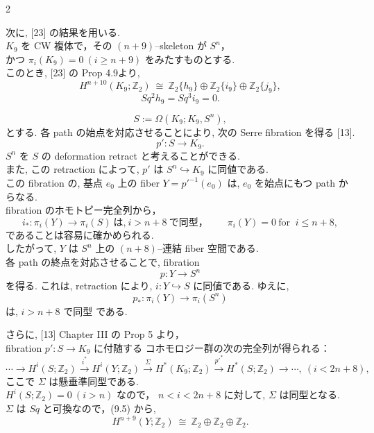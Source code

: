 \documentclass[10pt, leqno]{ltjsarticle}
\newcommand{\gen}[1]{\{#1\}}       %
\newcommand{\z}{\mathbb{Z}}
\numberwithin{equation}{section}
\theoremstyle{plain}
\theoremstyle{definition}
\theoremstyle{remark}
\begin{document}
\begin{paracol}{2}

次に, [23] の結果を用いる. \\
$K_9$ を CW 複体で，その $(n+9)$–skeleton が $S^n$，\\
かつ $\pi_i(K_9)=0\ (i\ge n+9)$ をみたすものとする. \\
このとき, [23] の Prop 4.9より, 
\begin{equation}\label{eq:K9coh}
H^{n+10}(K_9;\mathbb Z_2)\ \cong\ 
\z_2\gen{h_9}\oplus\z_2\gen{i_9}\oplus\z_2\gen{j_9},
\end{equation}
\[
Sq^2 h_9 = Sq^3 i_9 = 0.
\]

\[
S := \Omega(K_9; K_9, S^n),
\]
とする.
各 path の始点を対応させることにより, 
次の Serre fibration を得る [13].
\[
p':S\longrightarrow K_9.
\]
$S^n$ を \(S\) の deformation retract と考えることができる.\\
また, この retraction によって, 
\(p'\) は  $S^n\hookrightarrow K_9$ に同値である. \\
この fibration の, 基点 $e_0$ 上の fiber $Y=p'^{-1}(e_0)$ は,
$e_0$ を始点にもつ path からなる.\\
fibration のホモトピー完全列から，
\[
i_*:\pi_i(Y)\to\pi_i(S)
\ \text{は,}\ i>n+8\ \text{で同型，}\qquad
\pi_i(Y)=0\ \text{for }\ i\le n+8,
\]
であることは容易に確かめられる. \\
したがって,  $Y$ は $S^n$ 上の $(n+8)$–連結 fiber 空間である. \\
各 path の終点を対応させることで, fibration
\[
p:Y\longrightarrow S^n
\]
を得る. これは, retraction により, 
$i:Y\hookrightarrow S$ に同値である. 
ゆえに,
\[
p_*:\pi_i(Y)\longrightarrow \pi_i(S^n)
\]
は, $i>n+8$ で同型 である. 

さらに, [13] Chapter III の Prop 5 より，\\
fibration $p':S\to K_9$ に付随する
コホモロジー群の次の完全列が得られる：
\[
\cdots\longrightarrow H^{i}(S; \z_2)
\xrightarrow{i^*}H^i(Y; \z_2)
\xrightarrow{\Sigma} H^{*}(K_9; \z_2)
\xrightarrow{p'^*}H^{*}(S; \z_2)
\xrightarrow{}\cdots,\ (i<2n+8),
\]
ここで $\Sigma$ は懸垂準同型である. \\
$H^i(S;\mathbb Z_2)=0\ (i>n)$ なので，
$n<i<2n+8$ に対して, $\Sigma$ は同型となる. \\
$\Sigma$ は $Sq$ と可換なので，(9.5) から,
\begin{equation}\label{eq:Ycoh}
H^{n+9}(Y;\mathbb Z_2)\ \cong\ \mathbb Z_2\oplus\mathbb Z_2\oplus\mathbb Z_2.
\end{equation}


\end{paracol}
\end{document}
